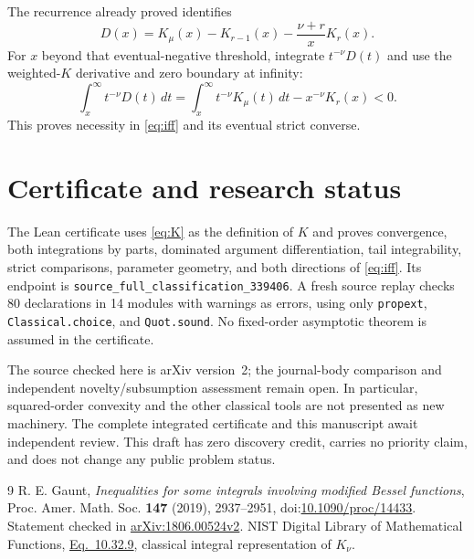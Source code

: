 \documentclass[11pt]{article}
\begin{document}
The recurrence already proved identifies
\[
 D(x)=K_\mu(x)-K_{r-1}(x)-\frac{\nu+r}{x}K_r(x).
\]
For $x$ beyond that eventual-negative threshold, integrate $t^{-\nu}D(t)$
and use the weighted-$K$ derivative and zero boundary at infinity:
\[
 \int_x^\infty t^{-\nu}D(t)\,dt
   =\int_x^\infty t^{-\nu}K_\mu(t)\,dt-x^{-\nu}K_r(x)<0.
\]
This proves necessity in \eqref{eq:iff} and its eventual strict converse.

\section{Certificate and research status}
The Lean certificate uses \eqref{eq:K} as the definition of $K$ and proves
convergence, both integrations by parts, dominated argument differentiation,
tail integrability, strict comparisons, parameter geometry, and both
directions of \eqref{eq:iff}. Its endpoint is
\texttt{source\_full\_classification\_339406}. A fresh source replay checks
80 declarations in 14 modules with warnings as errors, using only
\texttt{propext}, \texttt{Classical.choice}, and \texttt{Quot.sound}.
No fixed-order asymptotic theorem is assumed in the certificate.

The source checked here is arXiv version~2; the journal-body comparison and
independent novelty/subsumption assessment remain open. In particular,
squared-order convexity and the other classical tools are not presented as
new machinery. The complete integrated certificate and this manuscript
await independent review. This draft has zero discovery credit, carries no
priority claim, and does not change any public problem status.

\begin{thebibliography}{9}
 R. E. Gaunt, \emph{Inequalities for some integrals involving
modified Bessel functions}, Proc. Amer. Math. Soc. \textbf{147} (2019),
2937--2951, doi:\href{https://doi.org/10.1090/proc/14433}{10.1090/proc/14433}.
Statement checked in \href{https://arxiv.org/abs/1806.00524v2}{arXiv:1806.00524v2}.
 NIST Digital Library of Mathematical Functions,
\href{https://dlmf.nist.gov/10.32.E9}{Eq.~10.32.9}, classical integral
representation of $K_\nu$.
\end{thebibliography}
\end{document}
